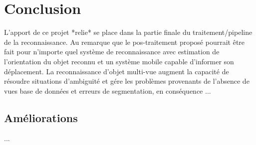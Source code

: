 {\color{green}
\chapter{Conclusion}

L'apport de ce projet *relie* se place dans la partie finale du
traitement/pipeline de la reconnaissance. Au remarque que le pos-traitement proposé pourrait être fait pour
n'importe quel système de reconnaissance avec estimation de l'orientation du objet reconnu et un système mobile capable d'informer son déplacement. La reconnaissance d'objet multi-vue augment la capacité de résoudre situations d'ambiguité et gére les problèmes provenants de l'absence de vues base de données et erreurs de segmentation, en conséquence ...

\section{ Améliorations }

...
}


